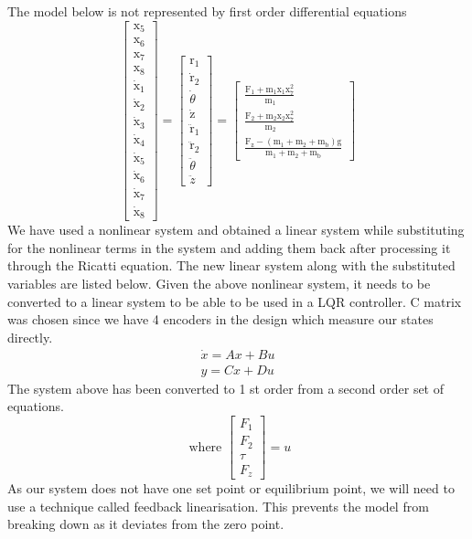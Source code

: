 \documentclass{UoNMCHA}
\numberwithin{equation}{section}
\begin{document}
The model below is not represented by first order differential equations
$$
\left[\begin{array}{c}
\mathrm{x}_{5} \\
\mathrm{x}_{6} \\
\mathrm{x}_{7} \\
\mathrm{x}_{8} \\
\dot{\mathrm{x}}_{1} \\
\dot{\mathrm{x}}_{2} \\
\dot{\mathrm{x}}_{3} \\
\dot{\mathrm{x}}_{4} \\
\dot{\mathrm{x}}_{5} \\
\dot{\mathrm{x}}_{6} \\
\dot{\mathrm{x}}_{7} \\
\dot{\mathrm{x}}_{8}
\end{array}\right]=\left[\begin{array}{c}
{\mathrm{r}}_{1} \\
\dot{\mathrm{r}}_{2} \\
\dot{\theta} \\
\dot{\mathrm{z}} \\
\ddot{\mathrm{r}}_{1} \\
\ddot{\mathrm{r}}_{2} \\
\ddot{\theta} \\
\ddot{z}
\end{array}\right]=\left[\begin{array}{c}
\frac{\mathrm{F}_{1}+\mathrm{m}_{1} \mathrm{x}_{1} \mathrm{x}_{7}^{2}}{\mathrm{~m}_{1}} \\
\frac{\mathrm{F}_{2}+\mathrm{m}_{2} \mathrm{x}_{2} \mathrm{x}_{7}^{2}}{\mathrm{~m}_{2}} \\
\frac{\mathrm{F}_{\mathrm{z}}-\left(\mathrm{m}_{1}+\mathrm{m}_{2}+\mathrm{m}_{\mathrm{b}}\right) \mathrm{g}}{\mathrm{m}_{1}+\mathrm{m}_{2}+\mathrm{m}_{\mathrm{b}}}
\end{array}\right]
$$
We have used a nonlinear system and obtained a linear system while substituting for the nonlinear terms
in the system and adding them back after processing it through the Ricatti equation. The new linear
system along with the substituted variables are listed below. Given the above nonlinear system, it needs
to be converted to a linear system to be able to be used in a LQR controller. C matrix was chosen since
we have 4 encoders in the design which measure our states directly.
$$
\begin{array}{l}
\dot{x}=A x+B u \\
y=C x+D u
\end{array}
$$
The system above has been converted to 1 st order from a second order set of equations.
$$
\text { where }\left[\begin{array}{c}
F_{1} \\
F_{2} \\
\tau \\
F_{z}
\end{array}\right]=u
$$
As our system does not have one set point or equilibrium point, we will need to use a technique called
feedback linearisation. This prevents the model from breaking down as it deviates from the zero point.
\end{document}

